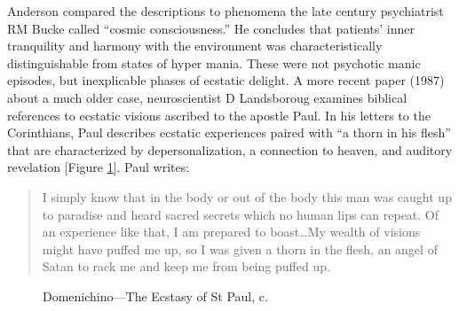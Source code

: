 \documentclass{UIdahoMastersThesis}
\begin{document}
Anderson compared the descriptions to phenomena the late  century psychiatrist RM Bucke called ``cosmic consciousness.'' He concludes that patients' inner tranquility and harmony with the environment was characteristically distinguishable from states of hyper mania. These were not psychotic manic episodes, but inexplicable phases of ecstatic delight.
A more recent paper (1987) about a much older case, neuroscientist D Landsboroug examines biblical references to ecstatic visions ascribed to the apostle Paul. In his letters to the Corinthians, Paul describes ecstatic experiences paired with ``a thorn in his flesh'' that are characterized by depersonalization, a connection to heaven, and auditory revelation [Figure \ref{fig:paul}]. Paul writes:

\begin{quote}
{I simply know that in the body or out of the body this man was caught up to paradise and heard sacred secrets which no human lips can repeat. Of an experience like that, I am prepared to boast\ldots My wealth of visions might have puffed me up, so I was given a thorn in the flesh, an angel of Satan to rack me and keep me from being puffed up.}\cite{bible_new_1984}
\end{quote}

\begin{figure}[h!]
	\centering
	{%
		\setlength{\fboxsep}{0pt}%
		\setlength{\fboxrule}{1.5pt}%
	}%
	\caption{Domenichino---The Ecstasy of St Paul,  c.}
	\label{fig:paul}
\end{figure}
\end{document}
